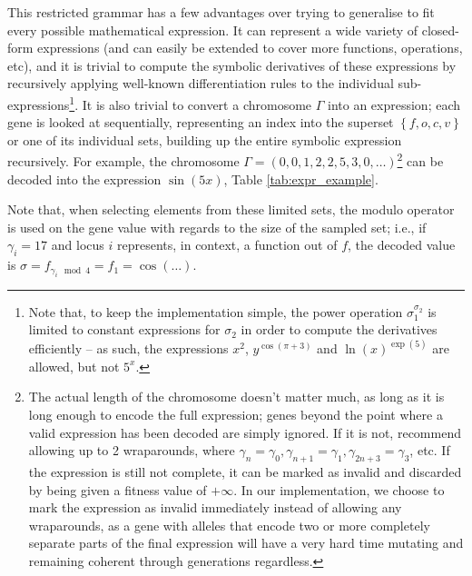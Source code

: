\documentclass[aps,reprint,superscriptaddress,nofootinbib]{revtex4-2}
\begin{document}
This restricted grammar has a few advantages over trying to generalise to fit every possible mathematical expression. It can represent a wide variety of closed-form expressions (and can easily be extended to cover more functions, operations, etc), and it is trivial to compute the symbolic derivatives of these expressions by recursively applying well-known differentiation rules to the individual sub-expressions\footnote{Note that, to keep the implementation simple, the power operation \(\sigma_1^{\sigma_2}\) is limited to constant expressions for \(\sigma_2\) in order to compute the derivatives efficiently -- as such, the expressions \(x^2\), \(y^{\cos(\pi + 3)}\) and \(\ln(x)^{\exp(5)}\) are allowed, but not \(5^x\).}. It is also trivial to convert a chromosome \(\Gamma\) into an expression; each gene is looked at sequentially, representing an index into the superset \(\left\{f, o, c, v\right\}\) or one of its individual sets, building up the entire symbolic expression recursively. For example, the chromosome \(\Gamma = \left(0, 0, 1, 2, 2, 5, 3, 0, \ldots\right)\)\footnote{The actual length of the chromosome doesn't matter much, as long as it is long enough to encode the full expression; genes beyond the point where a valid expression has been decoded are simply ignored. If it is not, \cite{solving_diff_reproduce} recommend allowing up to 2 wraparounds, where \(\gamma_n = \gamma_0, \gamma_{n+1} = \gamma_1, \gamma_{2n+3} = \gamma_3\), etc. If the expression is still not complete, it can be marked as invalid and discarded by being given a fitness value of \(+\infty\). In our implementation, we choose to mark the expression as invalid immediately instead of allowing any wraparounds, as a gene with alleles that encode two or more completely separate parts of the final expression will have a very hard time mutating and remaining coherent through generations regardless.} can be decoded into the expression \(\sin(5x)\), Table \ref{tab:expr_example}.

Note that, when selecting elements from these limited sets, the modulo operator is used on the gene value with regards to the size of the sampled set; i.e., if \(\gamma_i = 17\) and locus \(i\) represents, in context, a function out of \(f\), the decoded value is \(\sigma = f_{\gamma_i \mod 4} = f_1 = \cos(\ldots)\).
\end{document}

